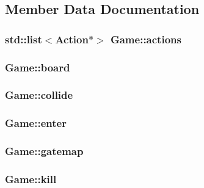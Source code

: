 \subsection{Member Data Documentation}
\hypertarget{class_game_a8e61c60693aa39b8a3deb5f3f277b43f}{
\subsubsection[{actions}]{\setlength{\rightskip}{0pt plus 5cm}std\-::list$<${\bf Action}$\ast$$>$ Game\-::actions}}\label{class_game_a8e61c60693aa39b8a3deb5f3f277b43f}
\hypertarget{class_game_af5bc546b0c766ecf2f7e008f750832ed}{
\subsubsection[{board}]{ Game\-::board}}\label{class_game_af5bc546b0c766ecf2f7e008f750832ed}
\hypertarget{class_game_aa2a0d5dc6a9af51c8b34c2cf27284d4a}{
\subsubsection[{collide}]{ Game\-::collide}}\label{class_game_aa2a0d5dc6a9af51c8b34c2cf27284d4a}
\hypertarget{class_game_a74330f1be42a0084acb37b91ef89664a}{
\subsubsection[{enter}]{ Game\-::enter}}\label{class_game_a74330f1be42a0084acb37b91ef89664a}
\hypertarget{class_game_a1d765a83bc51abcacd6d29982e8f1334}{
\subsubsection[{gatemap}]{ Game\-::gatemap}}\label{class_game_a1d765a83bc51abcacd6d29982e8f1334}
\hypertarget{class_game_a5e85f7712e3de31f39c90fb67faa8810}{
\subsubsection[{kill}]{ Game\-::kill}}\label{class_game_a5e85f7712e3de31f39c90fb67faa8810}
